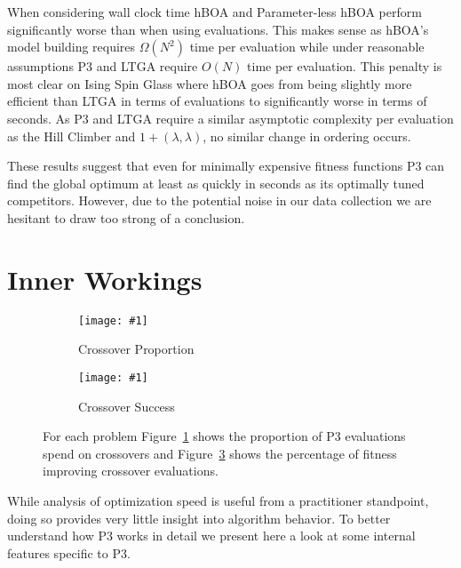 \documentclass[twoside]{article}
\newcommand{\includegraphicsfit}[1]
{\texttt{[image: \#1]}}
\begin{document}
When considering wall clock time hBOA and Parameter-less hBOA perform significantly worse than when using
evaluations. This makes sense as hBOA's model building requires $\Omega(N^2)$ time per evaluation while under reasonable
assumptions P3 and LTGA require $O(N)$ time per evaluation. This penalty is most clear on Ising Spin Glass where
hBOA goes from being slightly more efficient than LTGA in terms of evaluations to significantly worse in terms of seconds.
As P3 and LTGA require a similar asymptotic complexity per
evaluation as the Hill Climber and $1+(\lambda, \lambda)$, no similar change in ordering occurs.

These results suggest that even for minimally expensive fitness functions P3 can find the global optimum
at least as quickly in seconds as its optimally tuned competitors. However, due to the potential noise in our data collection
we are hesitant to draw too strong of a conclusion.

\section{Inner Workings}

\begin{figure}[t]
  \begin{centering}
    \begin{subfigure}{.5\textwidth}
      \begin{centering}
        \includegraphicsfit{cross}
      \end{centering}
      \caption{Crossover Proportion}
      \label{fig-cross}
    \end{subfigure}%
    \begin{subfigure}{.5\textwidth}
      \begin{centering}
        \includegraphicsfit{cross-success}
      \end{centering}
      \caption{Crossover Success}
      \label{fig-cross-success}
    \end{subfigure}
  \end{centering}
  \caption{For each problem Figure~\ref{fig-cross} shows the proportion of P3 evaluations spend on crossovers
           and Figure~\ref{fig-cross-success} shows the percentage of fitness improving crossover evaluations.}
\end{figure}

While analysis of optimization speed is useful from a practitioner standpoint, doing so provides very
little insight into algorithm behavior. To better understand how P3 works in detail we present here
a look at some internal features specific to P3.
\end{document}
